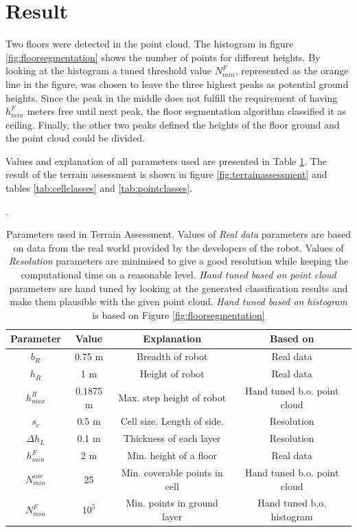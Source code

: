 \section{Result}
Two floors were detected in the point cloud. The histogram in figure \ref{fig:floorsegmentation} shows the number of points for different heights. By looking at the histogram a tuned threshold value $N^F_{min}$, represented as the orange line in the figure, was chosen to leave the three highest peaks as potential ground heights. Since the peak in the middle does not fulfill the requirement of having $h^F_{min}$ meters free until next peak, the floor segmentation algorithm classified it as ceiling. Finally, the other two peaks defined the heights of the floor ground and the point cloud could be divided. 

Values and explanation of all parameters used are presented in Table \ref{tab:TAparameters}. The result of the terrain assessment is shown in figure \ref{fig:terrainassessment} and tables \ref{tab:cellclasses} and \ref{tab:pointclasses}.  



\begin{table}[]
    \centering
    \caption{Parameters used in Terrain Assessment. Values of \emph{Real data} parameters are based on data from the real world provided by the developers of the robot. Values of \emph{Resolution} parameters are minimised to give a good resolution while keeping the computational time on a reasonable level. \emph{Hand tuned based on point cloud} parameters are hand tuned by looking at the generated classification results and make them plausible with the given point cloud. \emph{Hand tuned based on histogram} is based on Figure \ref{fig:floorsegmentation}}.
    \begin{tabular}{|c|c|c|c|}
        \hline 
        \textbf{Parameter} & \textbf{Value} & \textbf{Explanation} & \textbf{Based on} \\
        \hline 
        $b_R$ & 0.75 m & Breadth of robot & Real data \\
        $h_R$ & 1 m & Height of robot & Real data \\
        $h^R_{max}$ & 0.1875 m & Max. step height of robot & Hand tuned b.o. point cloud  \\
        $s_c$ & 0.5 m & Cell size. Length of side. & Resolution  \\
        $\Delta h_L$ & 0.1 m & Thickness of each layer & Resolution  \\
        $h^F_{min}$ & 2 m & Min. height of a floor & Real data  \\
        $N^{cov}_{min}$ & 25 & Min. coverable points in cell & Hand tuned b.o. point cloud \\
        $N^{F}_{min}$ & $10^5$ & Min. points in ground layer & Hand tuned b.o. histogram \\
        \hline 
    \end{tabular}
    
    \label{tab:TAparameters}
\end{table}


